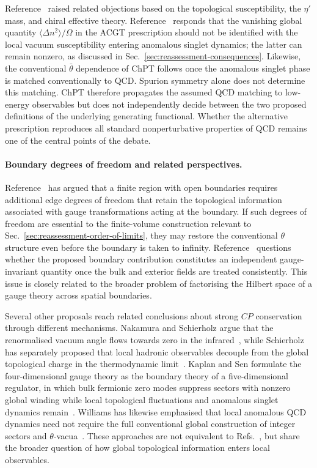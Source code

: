\documentclass[review]{elsarticle}
\numberwithin{equation}{section}
\numberwithin{table}{section}
\numberwithin{figure}{section}
\begin{document}
Reference~\cite{Benabou:2025viy} raised related objections based on the topological susceptibility, the $\eta'$ mass, and chiral effective theory. Reference~\cite{Ai:2025quf} responds that the vanishing global quantity $\langle\Delta n^2\rangle/\Omega$ in the ACGT prescription should not be identified with the local vacuum susceptibility entering anomalous singlet dynamics; the latter can remain nonzero, as discussed in Sec.~\ref{sec:reassessment-consequences}. Likewise, the conventional $\bar\theta$ dependence of ChPT follows once the anomalous singlet phase is matched conventionally to QCD. Spurion symmetry alone does not determine this matching. ChPT therefore propagates the assumed QCD matching to low-energy observables but does not independently decide between the two proposed definitions of the underlying generating functional. Whether the alternative prescription reproduces all standard nonperturbative properties of QCD remains one of the central points of the debate.

\paragraph{Boundary degrees of freedom and related perspectives.}

Reference~\cite{Kobakhidze:2026ymc} has argued that a finite region with open boundaries requires additional edge degrees of freedom that retain the topological information associated with gauge transformations acting at the boundary. If such degrees of freedom are essential to the finite-volume construction relevant to Sec.~\ref{sec:reassessment-order-of-limits}, they may restore the conventional $\theta$ structure even before the boundary is taken to infinity. Reference~\cite{Ai:2024cnp} questions whether the proposed boundary contribution constitutes an independent gauge-invariant quantity once the bulk and exterior fields are treated consistently. This issue is closely related to the broader problem of factorising the Hilbert space of a gauge theory across spatial boundaries.

Several other proposals reach related conclusions about strong $CP$ conservation through different mechanisms. Nakamura and Schierholz argue that the renormalised vacuum angle flows towards zero in the infrared~\cite{Nakamura:2021meh}, while Schierholz has separately proposed that local hadronic observables decouple from the global topological charge in the thermodynamic limit~\cite{Schierholz:2024var}. Kaplan and Sen formulate the four-dimensional gauge theory as the boundary theory of a five-dimensional regulator, in which bulk fermionic zero modes suppress sectors with nonzero global winding while local topological fluctuations and anomalous singlet dynamics remain~\cite{Kaplan:2024ezz}. Williams has likewise emphasised that local anomalous QCD dynamics need not require the full conventional global construction of integer sectors and $\theta$-vacua~\cite{Williams:2026cec,Williams:2026tuw}. These approaches are not equivalent to Refs.~\cite{Ai:2020ptm,Ai:2024vfa,Ai:2024cnp}, but share the broader question of how global topological information enters local observables.
\end{document}
